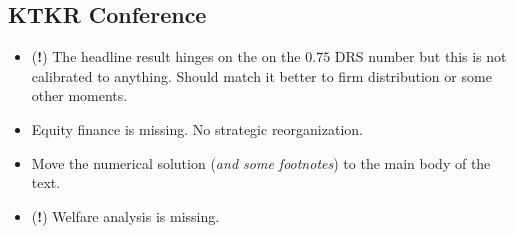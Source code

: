 \documentclass[12pt]{article}
\begin{document}
\subsection*{KTKR Conference}
\begin{itemize} \setlength\itemsep{0em}  \small
    \item (\textbf{!}) The headline result hinges on the on the $0.75$ DRS number but this is not calibrated to anything. Should match it better to firm distribution or some other moments. 
    \item Equity finance is missing. No strategic reorganization. 
    \item Move the numerical solution (\textit{and some footnotes}) to the main body of the text. 
    \item (\textbf{!}) Welfare analysis is missing. 
\end{itemize}
\end{document}
